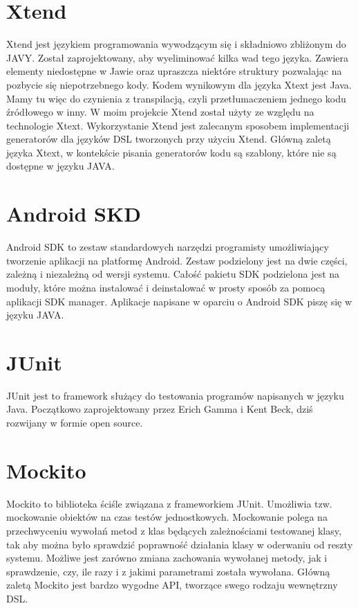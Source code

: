 \documentclass	{xmgr}
\begin{document}
\section{Xtend}

Xtend \cite{Xtend:2017:Doc} jest językiem programowania wywodzącym się i składniowo zbliżonym do JAVY. Został zaprojektowany, aby wyeliminować kilka wad tego języka. Zawiera elementy niedostępne w Jawie oraz upraszcza niektóre struktury pozwalając na pozbycie się niepotrzebnego kody. Kodem wynikowym dla języka Xtext jest Java. Mamy tu więc do czynienia z transpilacją, czyli przetłumaczeniem jednego kodu źródłowego w inny.
W moim projekcie Xtend został użyty ze względu na technologie Xtext. Wykorzystanie Xtend jest zalecanym sposobem implementacji generatorów dla języków DSL tworzonych przy użyciu Xtend. Główną zaletą języka Xtext, w kontekście pisania generatorów kodu są szablony, które nie są dostępne w języku JAVA.

\section{Android SKD}

Android SDK \cite{AndroidSDK:2017:Doc} to zestaw standardowych narzędzi programisty umożliwiający tworzenie aplikacji na platformę Android. Zestaw podzielony jest na dwie części, zależną i niezależną od wersji systemu. Całość pakietu SDK podzielona jest na moduły, które można instalować i deinstalować w prosty sposób za pomocą aplikacji SDK manager. Aplikacje napisane w oparciu o Android SDK piszę się w języku JAVA.

\section{JUnit}

JUnit \cite{JUnit:2017:Doc} jest to framework służący do testowania programów napisanych w języku Java. Początkowo zaprojektowany przez Erich Gamma i Kent Beck, dziś rozwijany w formie open source.

\section{Mockito}

Mockito \cite{Mockito:2017:Doc} to biblioteka ściśle związana z frameworkiem JUnit. Umożliwia tzw. mockowanie obiektów na czas testów jednostkowych. Mockowanie polega na przechwyceniu wywołań metod z klas będących zależnościami testowanej klasy, tak aby można było sprawdzić poprawność działania klasy w oderwaniu od reszty systemu. Możliwe jest zarówno zmiana zachowania wywołanej metody, jak i sprawdzenie, czy, ile razy i z jakimi parametrami została wywołana. Główną zaletą Mockito jest bardzo wygodne API, tworzące swego rodzaju wewnętrzny DSL.
 
\end{document}
